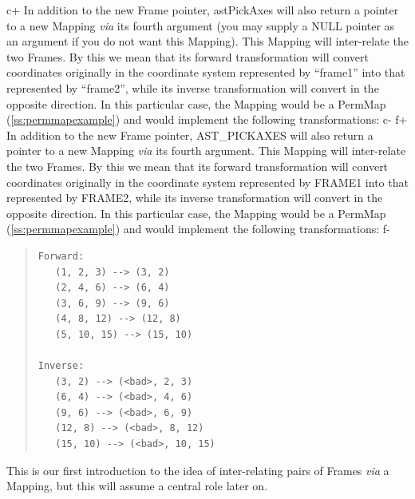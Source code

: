 \documentclass[twoside,11pt]{article}
\newcommand{\secref}[1]{\S\ref{#1}}
\renewcommand{\secref}[1]{\ref{#1}}
\begin{document}
c+
In addition to the new Frame pointer, astPickAxes will also return a
pointer to a new Mapping {\em{via}} its fourth argument (you may supply a
NULL pointer as an argument if you do not want this Mapping).  This
Mapping will inter-relate the two Frames. By this we mean that its
forward transformation will convert coordinates originally in the
coordinate system represented by ``frame1'' into that represented by
``frame2'', while its inverse transformation will convert in the
opposite direction. In this particular case, the Mapping would be a
PermMap (\secref{ss:permmapexample}) and would implement the following
transformations:
c-
f+
In addition to the new Frame pointer, AST\_PICKAXES will also return a
pointer to a new Mapping {\em{via}} its fourth argument. This Mapping will
inter-relate the two Frames. By this we mean that its forward
transformation will convert coordinates originally in the coordinate
system represented by FRAME1 into that represented by FRAME2, while
its inverse transformation will convert in the opposite direction. In
this particular case, the Mapping would be a PermMap
(\secref{ss:permmapexample}) and would implement the following
transformations:
f-

\begin{quote}
\begin{verbatim}
Forward:
   (1, 2, 3) --> (3, 2)
   (2, 4, 6) --> (6, 4)
   (3, 6, 9) --> (9, 6)
   (4, 8, 12) --> (12, 8)
   (5, 10, 15) --> (15, 10)

Inverse:
   (3, 2) --> (<bad>, 2, 3)
   (6, 4) --> (<bad>, 4, 6)
   (9, 6) --> (<bad>, 6, 9)
   (12, 8) --> (<bad>, 8, 12)
   (15, 10) --> (<bad>, 10, 15)
\end{verbatim}
\end{quote}

This is our first introduction to the idea of inter-relating pairs of
Frames {\em{via}} a Mapping, but this will assume a central role later on.
\end{document}
